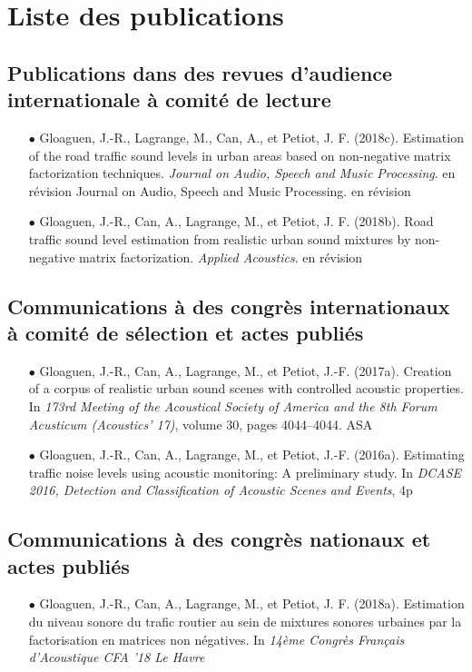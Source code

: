 \chapter*{Liste des publications}
\nobibliography*

\section*{Publications dans des revues d'audience internationale à comité de lecture}
\begin{itemize}
\item[$\bullet$] Gloaguen, J.-R., Lagrange, M., Can, A., et Petiot, J. F. (2018c). Estimation of the road traffic sound levels in urban areas based on non-negative matrix factorization techniques. \textit{Journal on Audio, Speech and Music Processing}. en révision
Journal on Audio, Speech and Music Processing. en révision
\item[$\bullet$] Gloaguen, J.-R., Can, A., Lagrange, M., et Petiot, J. F. (2018b). Road traffic sound level estimation from realistic urban sound mixtures by non-negative matrix factorization. \textit{Applied Acoustics}. en révision
\end{itemize}


\section*{Communications à des congrès internationaux à comité de sélection et actes publiés}
\begin{itemize}
\item[$\bullet$] Gloaguen, J.-R., Can, A., Lagrange, M., et  Petiot, J.-F. (2017a). Creation of a corpus of realistic urban sound scenes with controlled acoustic properties. In \textit{173rd Meeting of the Acoustical Society of America and the 8th Forum Acusticum (Acoustics’ 17)}, volume 30, pages 4044–4044. ASA
\item[$\bullet$] Gloaguen, J.-R., Can, A., Lagrange, M., et  Petiot, J.-F. (2016a). Estimating traffic noise levels using acoustic monitoring: A preliminary study. In \textit{DCASE 2016, Detection and Classification of Acoustic Scenes and Events}, 4p
\end{itemize}

\section*{Communications à des congrès nationaux et actes publiés}
\begin{itemize}
\item[$\bullet$] Gloaguen, J.-R., Can, A., Lagrange, M., et  Petiot, J. F. (2018a). Estimation du niveau sonore du trafic routier au sein de mixtures sonores urbaines par la factorisation en matrices non négatives. In \textit{14ème Congrès Français d’Acoustique CFA ’18 Le Havre}
\end{itemize}

